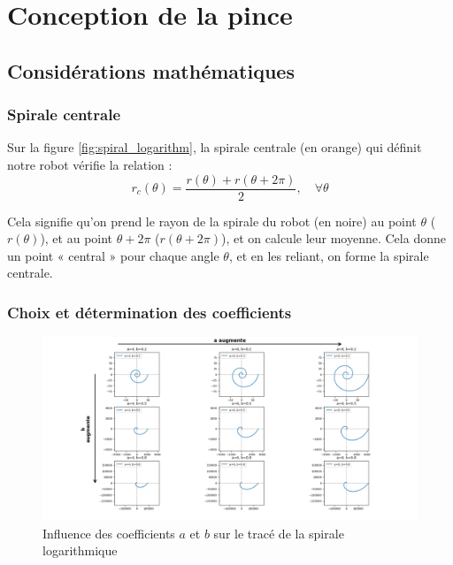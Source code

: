 \documentclass[a4paper, 11pt]{report}
\begin{document}
\clearpage
        
\section{Conception de la pince}
        
    \subsection{Considérations mathématiques}

        \subsubsection{Spirale centrale}
            
            Sur la figure \ref{fig:spiral_logarithm}, la spirale centrale (en orange) qui définit notre robot vérifie la relation :
            \begin{equation}
            r_c(\theta) = \frac{r(\theta) + r(\theta + 2\pi)}{2}, \quad \forall \theta
            \label{eq:spirale_centrale}
            \end{equation}
            
            Cela signifie qu’on prend le rayon de la spirale du robot (en noire) au point $\theta$ ($r(\theta)$), et au point $\theta + 2\pi$ ($r(\theta + 2\pi)$), et on calcule leur moyenne. Cela donne un point « central » pour chaque angle $\theta$, et en les reliant, on forme la spirale centrale. \cite{wang_spirobs_2025}

        \subsubsection{Choix et détermination des coefficients}

            \begin{figure}
                \centering
                \includegraphics[width=1\textwidth]{Figures/spirale.png}
                \caption{Influence des coefficients $a$ et $b$ sur le tracé de la spirale logarithmique}
                \label{fig:spirale}
            \end{figure}
        
\end{document}
